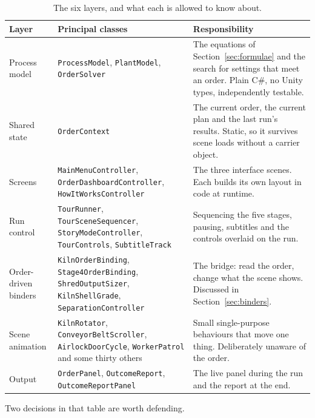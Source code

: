 \begin{table}[htbp]
  \centering
  \caption{The six layers, and what each is allowed to know about.}
  \label{tab:layers}
  \begin{tabular}{p{3.4cm}p{4.2cm}p{6.2cm}}
    \toprule
    Layer & Principal classes & Responsibility \\
    \midrule
    Process model &
      \texttt{ProcessModel}, \texttt{PlantModel}, \texttt{OrderSolver} &
      The equations of Section~\ref{sec:formulae} and the search for settings
      that meet an order. Plain C\#, no Unity types, independently testable. \\
    \addlinespace
    Shared state &
      \texttt{OrderContext} &
      The current order, the current plan and the last run's results. Static,
      so it survives scene loads without a carrier object. \\
    \addlinespace
    Screens &
      \texttt{MainMenuController}, \texttt{OrderDashboardController},
      \texttt{HowItWorksController} &
      The three interface scenes. Each builds its own layout in code at
      runtime. \\
    \addlinespace
    Run control &
      \texttt{TourRunner}, \texttt{TourSceneSequencer},
      \texttt{StoryModeController}, \texttt{TourControls},
      \texttt{SubtitleTrack} &
      Sequencing the five stages, pausing, subtitles and the controls
      overlaid on the run. \\
    \addlinespace
    Order-driven binders &
      \texttt{KilnOrderBinding}, \texttt{Stage4OrderBinding},
      \texttt{ShredOutputSizer}, \texttt{KilnShellGrade},
      \texttt{SeparationController} &
      The bridge: read the order, change what the scene shows. Discussed in
      Section~\ref{sec:binders}. \\
    \addlinespace
    Scene animation &
      \texttt{KilnRotator}, \texttt{ConveyorBeltScroller},
      \texttt{AirlockDoorCycle}, \texttt{WorkerPatrol} and some thirty others &
      Small single-purpose behaviours that move one thing. Deliberately
      unaware of the order. \\
    \addlinespace
    Output &
      \texttt{OrderPanel}, \texttt{OutcomeReport},
      \texttt{OutcomeReportPanel} &
      The live panel during the run and the report at the end. \\
    \bottomrule
  \end{tabular}
\end{table}

Two decisions in that table are worth defending.

